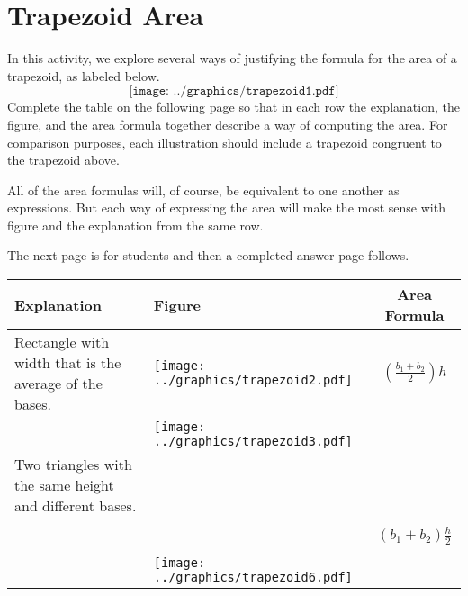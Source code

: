 \newpage

\section{Trapezoid Area}

\begin{prob}
In this activity, we explore several ways of justifying the formula for the area of a trapezoid, as labeled below. 
\[
\texttt{[image: ../graphics/trapezoid1.pdf]}
\]
Complete the table on the following page so that in each row the explanation, the figure, and the area formula together describe a way of computing the area.  For comparison purposes, each illustration should include a trapezoid congruent to the trapezoid above.   

All of the area formulas will, of course, be equivalent to one another as expressions.  But each way of expressing the area will make the most sense with figure and the explanation from the same row.  

\begin{teachingnote}
The next page is for students and then a completed answer page follows.
\end{teachingnote}



\newpage

\newlength{\formulawidth}

{\renewcommand{\arraystretch}{1.5}
\begin{tabular}{|>{\centering\arraybackslash}m{2.5cm}|>{\centering\arraybackslash}m{9.5cm}|c|}\hline
Explanation & Figure & Area Formula \\\hline

Rectangle with width that is the average of the bases. & \texttt{[image: ../graphics/trapezoid2.pdf]} & $\left(\frac{b_1+b_2}{2}\right)h$ \\ \hline
                              & \texttt{[image: ../graphics/trapezoid3.pdf]} &                      \\ \hline
Two triangles with the same height and different bases. &                 & \\ \hline
 & & \\ 
\bigskip                              &  & $(b_1+b_2)\frac{h}{2}$ \\ 
 & & \\ \hline
          & \texttt{[image: ../graphics/trapezoid6.pdf]}&  \hspace{\formulawidth} \\ \hline
\end{tabular}}

\end{prob}

